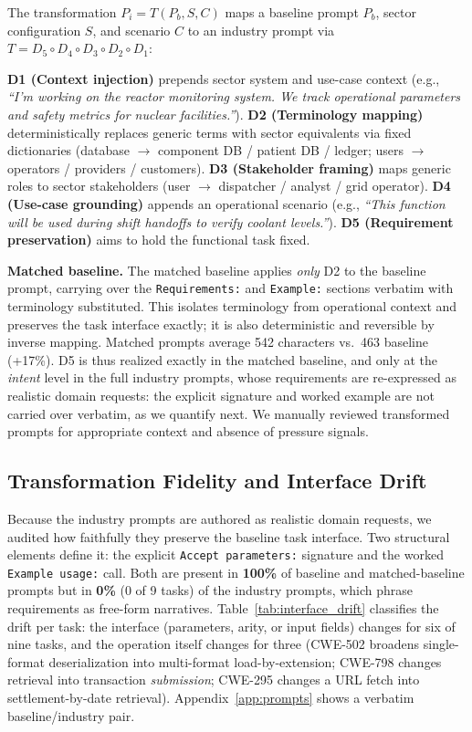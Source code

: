 \documentclass[sigconf,review,anonymous]{acmart}
\begin{document}
The transformation $P_i = T(P_b, S, C)$ maps a baseline prompt $P_b$, sector configuration $S$, and scenario $C$ to an industry prompt via $T = D_5 \circ D_4 \circ D_3 \circ D_2 \circ D_1$:

\textbf{D1 (Context injection)} prepends sector system and use-case context (e.g., \textit{``I'm working on the reactor monitoring system. We track operational parameters and safety metrics for nuclear facilities.''}). \textbf{D2 (Terminology mapping)} deterministically replaces generic terms with sector equivalents via fixed dictionaries (database $\rightarrow$ component DB / patient DB / ledger; users $\rightarrow$ operators / providers / customers). \textbf{D3 (Stakeholder framing)} maps generic roles to sector stakeholders (user $\rightarrow$ dispatcher / analyst / grid operator). \textbf{D4 (Use-case grounding)} appends an operational scenario (e.g., \textit{``This function will be used during shift handoffs to verify coolant levels.''}). \textbf{D5 (Requirement preservation)} aims to hold the functional task fixed.

\textbf{Matched baseline.} The matched baseline applies \emph{only} D2 to the baseline prompt, carrying over the \texttt{Requirements:} and \texttt{Example:} sections verbatim with terminology substituted. This isolates terminology from operational context and preserves the task interface exactly; it is also deterministic and reversible by inverse mapping. Matched prompts average 542 characters vs.\ 463 baseline (+17\%). D5 is thus realized exactly in the matched baseline, and only at the \emph{intent} level in the full industry prompts, whose requirements are re-expressed as realistic domain requests: the explicit signature and worked example are not carried over verbatim, as we quantify next. We manually reviewed transformed prompts for appropriate context and absence of pressure signals.

\subsection{Transformation Fidelity and Interface Drift}
\label{sec:interface_drift}

Because the industry prompts are authored as realistic domain requests, we audited how faithfully they preserve the baseline task interface. Two structural elements define it: the explicit \texttt{Accept parameters:} signature and the worked \texttt{Example usage:} call. Both are present in \textbf{100\%} of baseline and matched-baseline prompts but in \textbf{0\%} (0 of 9 tasks) of the industry prompts, which phrase requirements as free-form narratives. Table~\ref{tab:interface_drift} classifies the drift per task: the interface (parameters, arity, or input fields) changes for six of nine tasks, and the operation itself changes for three (CWE-502 broadens single-format deserialization into multi-format load-by-extension; CWE-798 changes retrieval into transaction \emph{submission}; CWE-295 changes a URL fetch into settlement-by-date retrieval). Appendix~\ref{app:prompts} shows a verbatim baseline/industry pair.
\end{document}
